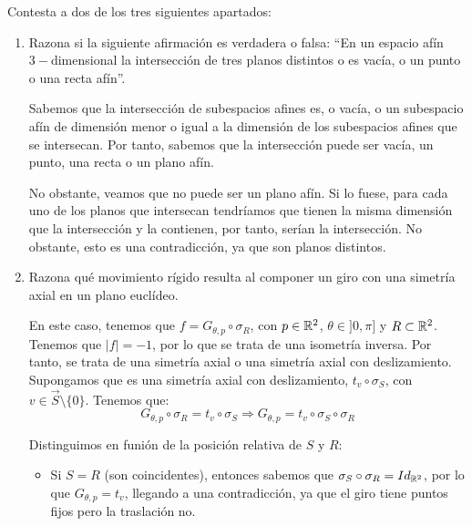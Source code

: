 \documentclass[12pt]{article}
\begin{document}
    \begin{ejercicio}[2.5 puntos]
        Contesta a dos de los tres siguientes apartados:
        \begin{enumerate}
            \item Razona si la siguiente afirmación es verdadera o falsa:
            ``En un espacio afín $3-$dimensional
            la intersección de tres planos distintos o es vacía, o un punto o una recta afín''.

            Sabemos que la intersección de subespacios afines es, o vacía, o un subespacio afín de dimensión menor o igual a la dimensión de los subespacios afines que se intersecan.
            Por tanto, sabemos que la intersección puede ser vacía, un punto, una recta o un plano afín.

            No obstante, veamos que no puede ser un plano afín. Si lo fuese, para cada uno de los planos que intersecan tendríamos que
            tienen la misma dimensión que la intersección y la contienen, por tanto, serían la intersección. No obstante, esto es
            una contradicción, ya que son planos distintos.

            \item Razona qué movimiento rígido resulta al componer un giro con una simetría axial en
            un plano euclídeo.

            En este caso, tenemos que $f = G_{\theta, p} \circ \sigma_{R}$, con $p\in \mathbb{R}^2$, $\theta \in ]0, \pi]$ y $R\subset \mathbb{R}^2$.
            Tenemos que $|f| = -1$, por lo que se trata de una isometría inversa.
            Por tanto, se trata de una simetría axial o una simetría axial con deslizamiento. Supongamos que
            es una simetría axial con deslizamiento, $t_v\circ \sigma_{S}$, con $v\in \vec{S}\setminus \{0\}$. Tenemos que:
            \begin{equation*}
                G_{\theta, p} \circ \sigma_{R} = t_v\circ \sigma_{S} \Longrightarrow
                G_{\theta, p} = t_v\circ \sigma_{S} \circ \sigma_{R}
            \end{equation*}

            Distinguimos en funión de la posición relativa de $S$ y $R$:
            \begin{itemize}
                \item Si $S=R$ (son coincidentes), entonces sabemos que $\sigma_{S} \circ \sigma_{R}= Id_{\mathbb{R}^2}$,
                por lo que $G_{\theta, p}=t_v$, llegando a una contradicción, ya que el giro tiene puntos fijos pero la traslación no.


\end{itemize}
\end{enumerate}
\end{ejercicio}
\end{document}

